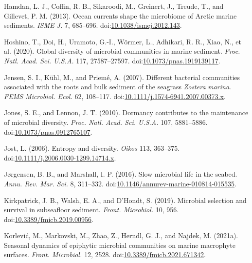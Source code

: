 \documentclass[12pt,]{article}
\begin{document}
\leavevmode\hypertarget{ref-Hamdan2013a}{}%
Hamdan, L. J., Coffin, R. B., Sikaroodi, M., Greinert, J., Treude, T.,
and Gillevet, P. M. (2013). Ocean currents shape the microbiome of
Arctic marine sediments. \emph{ISME J.} 7, 685--696.
doi:\href{https://doi.org/10.1038/ismej.2012.143}{10.1038/ismej.2012.143}.

\leavevmode\hypertarget{ref-Hoshino2020}{}%
Hoshino, T., Doi, H., Uramoto, G.-I., Wörmer, L., Adhikari, R. R., Xiao,
N., et al. (2020). Global diversity of microbial communities in marine
sediment. \emph{Proc. Natl. Acad. Sci. U.S.A.} 117, 27587--27597.
doi:\href{https://doi.org/10.1073/pnas.1919139117}{10.1073/pnas.1919139117}.

\leavevmode\hypertarget{ref-Jensen2007a}{}%
Jensen, S. I., Kühl, M., and Priemé, A. (2007). Different bacterial
communities associated with the roots and bulk sediment of the seagrass
\emph{Zostera} \emph{marina}. \emph{FEMS Microbiol. Ecol.} 62, 108--117.
doi:\href{https://doi.org/10.1111/j.1574-6941.2007.00373.x}{10.1111/j.1574-6941.2007.00373.x}.

\leavevmode\hypertarget{ref-Jones2010}{}%
Jones, S. E., and Lennon, J. T. (2010). Dormancy contributes to the
maintenance of microbial diversity. \emph{Proc. Natl. Acad. Sci. U.S.A.}
107, 5881--5886.
doi:\href{https://doi.org/10.1073/pnas.0912765107}{10.1073/pnas.0912765107}.

\leavevmode\hypertarget{ref-Jost2006}{}%
Jost, L. (2006). Entropy and diversity. \emph{Oikos} 113, 363--375.
doi:\href{https://doi.org/10.1111/j.2006.0030-1299.14714.x}{10.1111/j.2006.0030-1299.14714.x}.

\leavevmode\hypertarget{ref-Jorgensen2016}{}%
Jørgensen, B. B., and Marshall, I. P. (2016). Slow microbial life in the
seabed. \emph{Annu. Rev. Mar. Sci.} 8, 311--332.
doi:\href{https://doi.org/10.1146/annurev-marine-010814-015535}{10.1146/annurev-marine-010814-015535}.

\leavevmode\hypertarget{ref-Kirkpatrick2019}{}%
Kirkpatrick, J. B., Walsh, E. A., and D'Hondt, S. (2019). Microbial
selection and survival in subseafloor sediment. \emph{Front. Microbiol.}
10, 956.
doi:\href{https://doi.org/10.3389/fmicb.2019.00956}{10.3389/fmicb.2019.00956}.

\leavevmode\hypertarget{ref-Korlevic2021a}{}%
Korlević, M., Markovski, M., Zhao, Z., Herndl, G. J., and Najdek, M.
(2021a). Seasonal dynamics of epiphytic microbial communities on marine
macrophyte surfaces. \emph{Front. Microbiol.} 12, 2528.
doi:\href{https://doi.org/10.3389/fmicb.2021.671342}{10.3389/fmicb.2021.671342}.
\end{document}
